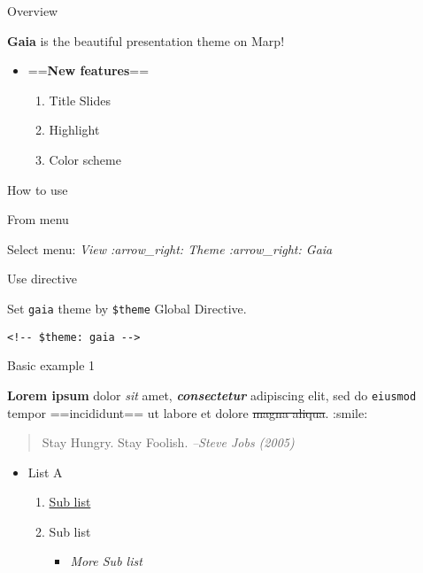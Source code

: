 \documentclass[ignorenonframetext,]{beamer}
\providecommand{\tightlist}{%
  \setlength{\itemsep}{0pt}\setlength{\parskip}{0pt}}
\begin{document}
\begin{frame}{Overview}

\textbf{Gaia} is the beautiful presentation theme on Marp!

\begin{itemize}
\tightlist
\item
  ==\textbf{New features}==

  \begin{enumerate}
  \def\labelenumi{\arabic{enumi}.}
  \tightlist
  \item
    Title Slides
  \item
    Highlight
  \item
    Color scheme
  \end{enumerate}
\end{itemize}

\end{frame}

\begin{frame}[fragile]{How to use}

\begin{block}{From menu}

Select menu: \emph{View :arrow\_right: Theme :arrow\_right: Gaia}

\end{block}

\begin{block}{Use directive}

Set \texttt{gaia} theme by \texttt{\$theme} Global Directive.

\begin{verbatim}
<!-- $theme: gaia -->
\end{verbatim}

\end{block}

\end{frame}

\begin{frame}{Basic example 1}

\textbf{Lorem ipsum} dolor \emph{sit} amet, \textbf{\emph{consectetur}}
adipiscing elit, sed do \texttt{eiusmod} tempor ==incididunt== ut labore
et dolore \sout{magna aliqua}. :smile:

\begin{quote}
Stay Hungry. Stay Foolish. \emph{--Steve Jobs (2005)}
\end{quote}

\begin{itemize}
\tightlist
\item
  List A

  \begin{enumerate}
  \def\labelenumi{\arabic{enumi}.}
  \tightlist
  \item
    \href{https://yhatt.github.io/marp/}{Sub list}
  \item
    Sub list

    \begin{itemize}
    \tightlist
    \item
      \emph{More Sub list}
    \end{itemize}
  \end{enumerate}
\end{itemize}

\end{frame}
\end{document}
